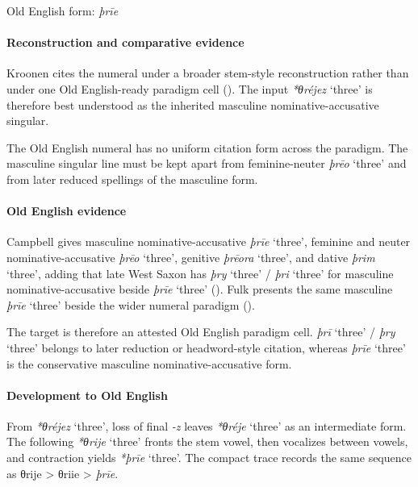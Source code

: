 \documentclass[
  british,
  a4paper,
]{article}
\providecommand{\Recon}[1]{\emph{*#1}}
\begin{document}
Old English form: \emph{þrīe}

\paragraph{Reconstruction and comparative
evidence}\label{reconstruction-and-comparative-evidence-88}

Kroonen cites the numeral under a broader stem-style reconstruction
rather than under one Old English-ready paradigm cell
(). The input
\Recon{θréjez} `three' is therefore best understood as the inherited
masculine nominative-accusative singular.

The Old English numeral has no uniform citation form across the
paradigm. The masculine singular line must be kept apart from
feminine-neuter \emph{þrēo} `three' and from later reduced spellings of
the masculine form.

\paragraph{Old English evidence}\label{old-english-evidence-90}

Campbell gives masculine nominative-accusative {\emph{þrīe}} `three',
feminine and neuter nominative-accusative {\emph{þrēo}} `three',
genitive {\emph{þrēora}} `three', and dative {\emph{þrim}} `three',
adding that late West Saxon has \emph{þry} `three' / \emph{þri} `three'
for masculine nominative-accusative beside {\emph{þrīe}} `three'
(). Fulk presents
the same masculine \emph{þrīe} `three' beside the wider numeral paradigm
().

The target is therefore an attested Old English paradigm cell.
\emph{þrī} `three' / \emph{þry} `three' belongs to later reduction or
headword-style citation, whereas {\emph{þrīe}} `three' is the
conservative masculine nominative-accusative form.

\paragraph{Development to Old
English}\label{development-to-old-english-88}

From \Recon{θréjez} `three', loss of final \emph{-z} leaves
\Recon{θréje} `three' as an intermediate form. The following
\Recon{θrije} `three' fronts the stem vowel, then vocalizes between
vowels, and contraction yields \Recon{þrīe} `three'. The compact trace
records the same sequence as θrije \textgreater{} θriie \textgreater{}
\emph{þrīe}.
\end{document}
